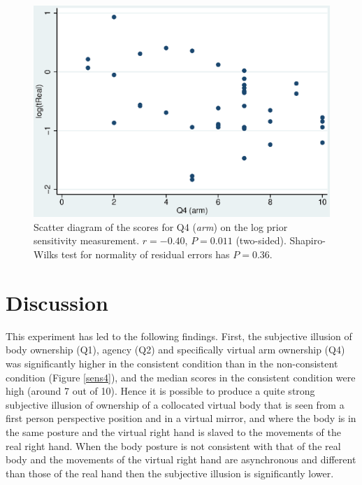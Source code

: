 \documentclass[
		twoside,openright,titlepage,numbers=noenddot,manychapters,
		headinclude,%
                footinclude=false,cleardoublepage=empty,
                BCOR=5mm,
		fontsize=11pt, %
                 enabledeprecatedfontcommands]{scrreprt}
\begin{document}
\begin{figure}[]

\begin{center}

\includegraphics[width=12cm]{figures/sens/Figure7.eps}
\caption{Scatter diagram of the scores for Q4 (\emph{arm}) on the log prior sensitivity measurement. $r = -0.40$, $P = 0.011$ (two-sided). Shapiro-Wilks test for normality of residual errors has $P = 0.36$. }
\label{sens7}

\end{center}

\end{figure} 


\section{Discussion}
\label{disc_embodiment}
This experiment has led to the following findings. First, the subjective illusion of body ownership (Q1), agency (Q2) and specifically virtual arm ownership (Q4) was significantly higher in the consistent condition than in the non-consistent condition (Figure \ref{sens4}), and the median scores in the consistent condition were high (around 7 out of 10). Hence it is possible to produce a quite strong subjective illusion of ownership of a collocated virtual body that is seen from a first person perspective position and in a virtual mirror, and where the body is in the same posture and the virtual right hand is slaved to the movements of the real right hand. When the body posture is not consistent with that of the real body and the movements of the virtual right hand are asynchronous and different than those of the real hand then the subjective illusion is significantly lower.
\end{document}
